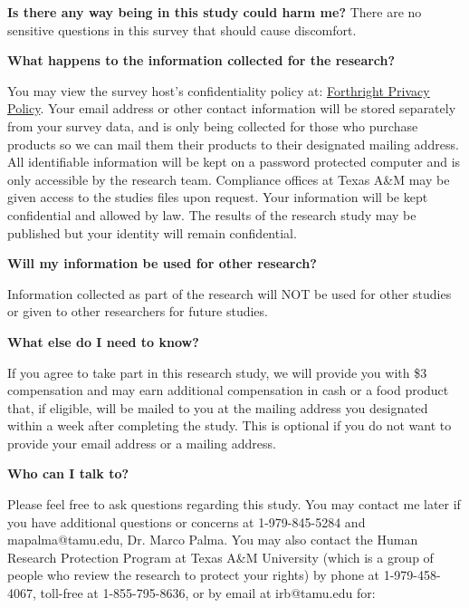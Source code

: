 \documentclass[12pt]{article}
\begin{document}
\textbf{Is there any way being in this study could harm me?}
There are no sensitive questions in this survey that should cause discomfort. \par

\textbf{What happens to the information collected for the research?} \par
You may view the survey host’s confidentiality policy at: \href{https://www.beforthright.com/privacy}{Forthright Privacy Policy}. Your email address or other contact information will be stored separately from your survey data, and is only being collected for those who purchase products so we can mail them their products to their designated mailing address. All identifiable information will be kept on a password protected computer and is only accessible by the research team. Compliance offices at Texas A\&M may be given access to the studies files upon request. Your information will be kept confidential and allowed by law. The results of the research study may be published but your identity will remain confidential. \par

\textbf{Will my information be used for other research?} \par
Information collected as part of the research will NOT be used for other studies or given to other researchers for future studies. \par

\textbf{What else do I need to know?} \par

If you agree to take part in this research study, we will provide you with  \$3 compensation and may earn additional compensation in cash or a food product that, if eligible, will be mailed to you at the mailing address you designated within a week after completing the study. This is optional if you do not want to provide your email address or a mailing address. \par

\textbf{Who can I talk to?} \par

Please feel free to ask questions regarding this study. You may contact me later if you have additional questions or concerns at 1-979-845-5284 and mapalma@tamu.edu, Dr. Marco Palma. You may also contact the Human Research Protection Program at Texas A\&M University (which is a group of people who review the research to protect your rights) by phone at 1-979-458-4067, toll-free at 1-855-795-8636, or by email at irb@tamu.edu for:\par
\end{document}
